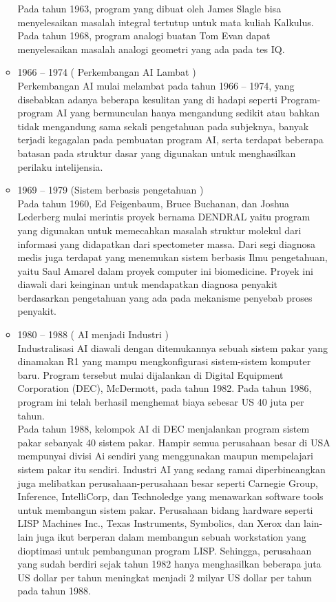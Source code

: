 \begin{enumerate}
\begin{itemize}
    Pada tahun 1963, program yang dibuat oleh James Slagle bisa menyelesaikan masalah integral tertutup untuk mata kuliah Kalkulus.\\
    Pada tahun 1968, program analogi buatan Tom Evan dapat menyelesaikan masalah analogi geometri yang ada pada tes IQ.
    \item 1966 – 1974 ( Perkembangan AI Lambat )\\
    Perkembangan AI mulai melambat pada tahun 1966 – 1974, yang disebabkan adanya beberapa kesulitan yang di hadapi seperti  Program-program AI yang bermunculan hanya mengandung sedikit atau bahkan tidak mengandung sama sekali pengetahuan pada subjeknya, banyak terjadi kegagalan pada pembuatan program AI, serta terdapat beberapa batasan pada struktur dasar yang digunakan untuk menghasilkan perilaku intelijensia.
    \item 1969 – 1979 (Sistem berbasis pengetahuan )\\
    Pada tahun 1960, Ed Feigenbaum, Bruce Buchanan, dan Joshua Lederberg mulai merintis proyek bernama DENDRAL yaitu program yang digunakan untuk memecahkan masalah struktur molekul dari informasi yang didapatkan dari spectometer massa. Dari segi diagnosa medis juga terdapat  yang menemukan sistem berbasis Ilmu pengetahuan, yaitu Saul Amarel dalam proyek computer ini biomedicine. Proyek ini diawali dari keinginan untuk mendapatkan diagnosa penyakit berdasarkan pengetahuan yang ada pada mekanisme penyebab proses penyakit.
    \item 1980 – 1988 ( AI menjadi Industri )\\
    Industralisasi AI diawali dengan ditemukannya sebuah sistem pakar yang dinamakan R1 yang mampu mengkonfigurasi sistem-sistem komputer baru. Program tersebut mulai dijalankan di Digital Equipment Corporation (DEC), McDermott, pada tahun 1982. Pada tahun 1986, program ini telah berhasil menghemat biaya sebesar US 40 juta per tahun.\\
    Pada tahun 1988, kelompok AI di DEC menjalankan program sistem pakar sebanyak 40 sistem pakar. Hampir semua perusahaan besar di USA mempunyai divisi Ai sendiri yang menggunakan maupun mempelajari sistem pakar itu sendiri. Industri AI yang sedang ramai diperbincangkan juga melibatkan perusahaan-perusahaan besar seperti Carnegie Group, Inference, IntelliCorp, dan Technoledge yang menawarkan software tools untuk membangun sistem pakar. Perusahaan bidang hardware seperti LISP Machines Inc., Texas Instruments, Symbolics, dan Xerox dan lain-lain juga ikut berperan dalam membangun sebuah workstation yang dioptimasi untuk pembangunan program LISP. Sehingga, perusahaan yang sudah berdiri sejak tahun 1982 hanya menghasilkan beberapa juta US dollar per tahun meningkat menjadi 2 milyar US dollar per tahun pada tahun 1988.

\end{itemize}
\end{enumerate}
